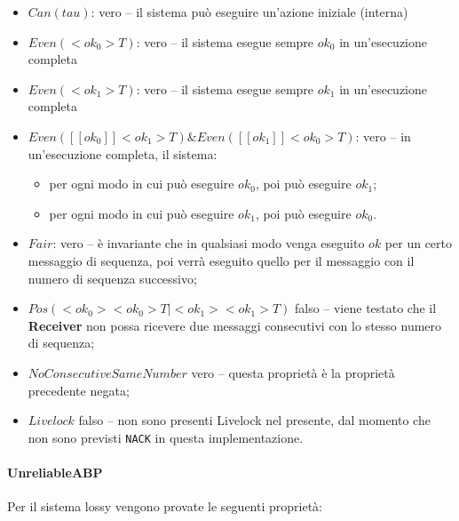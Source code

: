 \begin{itemize}
  \item $Can(tau)$: vero -- il sistema può eseguire un'azione iniziale
    (interna)
  \item $Even(<ok_0>T)$: vero -- il sistema esegue sempre $ok_0$ in
    un'esecuzione completa
  \item $Even(<ok_1>T)$: vero -- il sistema esegue sempre $ok_1$ in
    un'esecuzione completa
  \item $Even([[ok_0]]<ok_1>T) \&{} Even([[ok_1]]<ok_0>T)$: vero -- in
    un'esecuzione completa, il sistema:
    \begin{itemize}
      \item per ogni modo in cui può eseguire $ok_0$, poi può eseguire $ok_1$;
      \item per ogni modo in cui può eseguire $ok_1$, poi può eseguire $ok_0$.
    \end{itemize}
  \item $Fair$: vero -- è invariante che in qualsiasi modo venga eseguito $ok$
    per un certo messaggio di sequenza, poi verrà eseguito quello per il
    messaggio con il numero di sequenza successivo;
  \item $Pos(<ok_0><ok_0>T | <ok_1><ok_1>T)$ falso -- viene testato che il
    \textbf{Receiver} non possa ricevere due messaggi consecutivi con lo stesso
    numero di sequenza;
  \item $NoConsecutiveSameNumber$ vero -- questa proprietà è la proprietà
    precedente negata;
  \item $Livelock$ falso -- non sono presenti Livelock nel presente, dal
    momento che non sono previsti \texttt{NACK} in questa implementazione.
\end{itemize}

\paragraph{UnreliableABP} \mbox{}

Per il sistema lossy vengono provate le seguenti proprietà:

